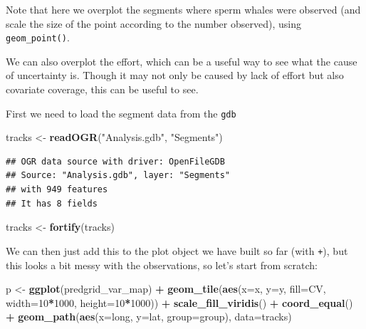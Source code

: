 \documentclass[]{book}
\newenvironment{Shaded}{\begin{snugshade}}{\end{snugshade}}
\newcommand{\KeywordTok}[1]{\textcolor[rgb]{0.13,0.29,0.53}{\textbf{#1}}}
\newcommand{\DataTypeTok}[1]{\textcolor[rgb]{0.13,0.29,0.53}{#1}}
\newcommand{\DecValTok}[1]{\textcolor[rgb]{0.00,0.00,0.81}{#1}}
\newcommand{\StringTok}[1]{\textcolor[rgb]{0.31,0.60,0.02}{#1}}
\newcommand{\OperatorTok}[1]{\textcolor[rgb]{0.81,0.36,0.00}{\textbf{#1}}}
\newcommand{\NormalTok}[1]{#1}
\theoremstyle{definition}
\theoremstyle{definition}
\theoremstyle{remark}
\begin{document}
Note that here we overplot the segments where sperm whales were observed
(and scale the size of the point according to the number observed),
using \texttt{geom\_point()}.

We can also overplot the effort, which can be a useful way to see what
the cause of uncertainty is. Though it may not only be caused by lack of
effort but also covariate coverage, this can be useful to see.

First we need to load the segment data from the \texttt{gdb}

\begin{Shaded}
\begin{Highlighting}[]
\NormalTok{tracks <-}\StringTok{ }\KeywordTok{readOGR}\NormalTok{(}\StringTok{"Analysis.gdb"}\NormalTok{, }\StringTok{"Segments"}\NormalTok{)}
\end{Highlighting}
\end{Shaded}

\begin{verbatim}
## OGR data source with driver: OpenFileGDB 
## Source: "Analysis.gdb", layer: "Segments"
## with 949 features
## It has 8 fields
\end{verbatim}

\begin{Shaded}
\begin{Highlighting}[]
\NormalTok{tracks <-}\StringTok{ }\KeywordTok{fortify}\NormalTok{(tracks)}
\end{Highlighting}
\end{Shaded}

We can then just add this to the plot object we have built so far (with
\texttt{+}), but this looks a bit messy with the observations, so let's
start from scratch:

\begin{Shaded}
\begin{Highlighting}[]
\NormalTok{p <-}\StringTok{ }\KeywordTok{ggplot}\NormalTok{(predgrid_var_map) }\OperatorTok{+}
\StringTok{       }\KeywordTok{geom_tile}\NormalTok{(}\KeywordTok{aes}\NormalTok{(}\DataTypeTok{x=}\NormalTok{x, }\DataTypeTok{y=}\NormalTok{y, }\DataTypeTok{fill=}\NormalTok{CV, }\DataTypeTok{width=}\DecValTok{10}\OperatorTok{*}\DecValTok{1000}\NormalTok{, }\DataTypeTok{height=}\DecValTok{10}\OperatorTok{*}\DecValTok{1000}\NormalTok{)) }\OperatorTok{+}
\StringTok{       }\KeywordTok{scale_fill_viridis}\NormalTok{() }\OperatorTok{+}
\StringTok{       }\KeywordTok{coord_equal}\NormalTok{() }\OperatorTok{+}
\StringTok{       }\KeywordTok{geom_path}\NormalTok{(}\KeywordTok{aes}\NormalTok{(}\DataTypeTok{x=}\NormalTok{long, }\DataTypeTok{y=}\NormalTok{lat, }\DataTypeTok{group=}\NormalTok{group), }\DataTypeTok{data=}\NormalTok{tracks)}
\end{Highlighting}
\end{Shaded}
\end{document}
